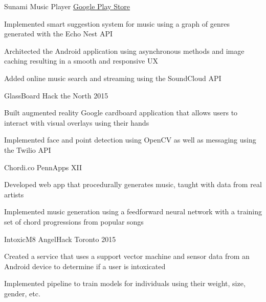 \begin{cvprojects}
  \cvproject
    {Sunami Music Player}
    {\href{http://play.google.com/store/apps/details?id=com.wojtechnology.sunami}{Google Play Store}}
    {
      \begin{cvitems}
        \item Implemented smart suggestion system for music using a graph of genres generated with the Echo Nest API
        \item Architected the Android application using asynchronous methods and image caching resulting in a smooth and responsive UX
        \item Added online music search and streaming using the SoundCloud API
      \end{cvitems}
    }
  \cvproject
    {GlassBoard}
    {Hack the North 2015}
    {
      \begin{cvitems}
        \item Built augmented reality Google cardboard application that allows users to interact with visual overlays using their hands
        \item Implemented face and point detection using OpenCV as well as messaging using the Twilio API
      \end{cvitems}
    }
  \cvproject
    {Chordi.co}
    {PennApps XII}
    {
      \begin{cvitems}
        \item Developed web app that procedurally generates music, taught with data from real artists
        \item Implemented music generation using a feedforward neural network with a training set of chord progressions from popular songs
      \end{cvitems}
    }
  \cvproject
    {IntoxicM8}
    {AngelHack Toronto 2015}
    {
      \begin{cvitems}
        \item Created a service that uses a support vector machine and sensor data from an Android device to determine if a user is intoxicated
        \item Implemented pipeline to train models for individuals using their weight, size, gender, etc.
      \end{cvitems}
    }
\end{cvprojects}
